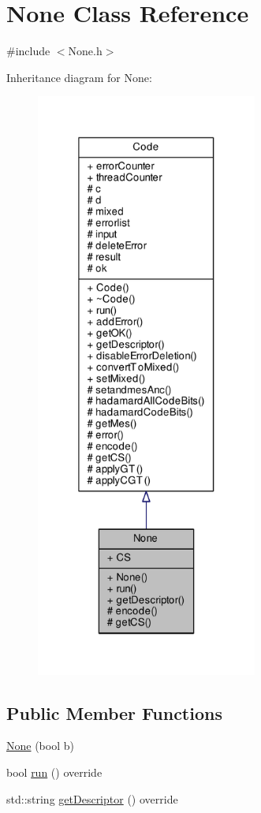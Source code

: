 \hypertarget{class_none}{}\section{None Class Reference}
\label{class_none}


{\ttfamily \#include $<$None.\+h$>$}



Inheritance diagram for None\+:\nopagebreak
\begin{figure}[H]
\begin{center}
\leavevmode
\includegraphics[height=550pt]{class_none__inherit__graph}
\end{center}
\end{figure}
\subsection*{Public Member Functions}
\begin{DoxyCompactItemize}
\item 
\hyperlink{class_none_a57e854dd2b23d85d5476402f85b47ea0}{None} (bool b)
\item 
bool \hyperlink{class_none_aa8386e7d54637a7fd089bb84b5518c9d}{run} () override
\item 
std\+::string \hyperlink{class_none_a0ad5c4d177835a8fc0498d606fefbd79}{get\+Descriptor} () override
\end{DoxyCompactItemize}
